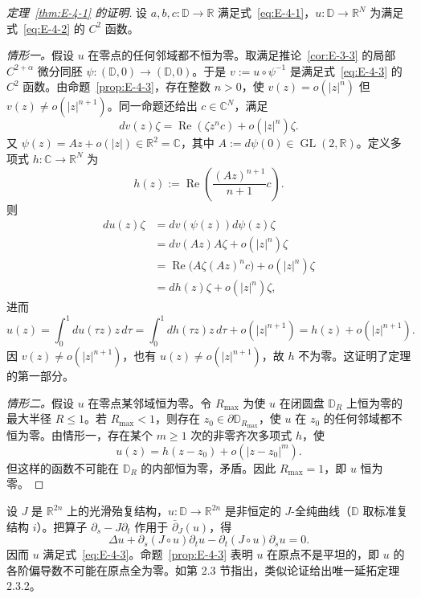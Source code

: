 \begin{proof}[定理~\ref{thm:E-4-1} 的证明]
设 $a,b,c:\mathbb D\to\mathbb R$ 满足式~\eqref{eq:E-4-1}，$u:\mathbb D\to\mathbb R^N$ 为满足式~\eqref{eq:E-4-2} 的 $C^2$ 函数。

\emph{情形一。}假设 $u$ 在零点的任何邻域都不恒为零。取满足推论~\ref{cor:E-3-3} 的局部 $C^{2+\alpha}$ 微分同胚 $\psi:(\mathbb D,0)\to(\mathbb D,0)$。于是 $v:=u\circ\psi^{-1}$ 是满足式~\eqref{eq:E-4-3} 的 $C^2$ 函数。由命题~\ref{prop:E-4-3}，存在整数 $n>0$，使 $v(z)=o(|z|^n)$ 但 $v(z)\ne o(|z|^{n+1})$。同一命题还给出 $c\in\mathbb C^N$，满足
\[
  dv(z)\zeta=\operatorname{Re}(\zeta z^nc)+o(|z|^n)\zeta.
\]
又 $\psi(z)=Az+o(|z|)\in\mathbb R^2=\mathbb C$，其中 $A:=d\psi(0)\in\operatorname{GL}(2,\mathbb R)$。定义多项式 $h:\mathbb C\to\mathbb R^N$ 为
\[
  h(z):=\operatorname{Re}\left(\frac{(Az)^{n+1}}{n+1}c\right).
\]
则
\begin{align*}
du(z)\zeta
 &=dv(\psi(z))d\psi(z)\zeta\\
 &=dv(Az)A\zeta+o(|z|^n)\zeta\\
 &=\operatorname{Re}\bigl(A\zeta(Az)^nc\bigr)+o(|z|^n)\zeta\\
 &=dh(z)\zeta+o(|z|^n)\zeta,
\end{align*}
进而
\[
  u(z)=\int_0^1du(\tau z)z\,d\tau
      =\int_0^1dh(\tau z)z\,d\tau+o(|z|^{n+1})
      =h(z)+o(|z|^{n+1}).
\]
因 $v(z)\ne o(|z|^{n+1})$，也有 $u(z)\ne o(|z|^{n+1})$，故 $h$ 不为零。这证明了定理的第一部分。

\emph{情形二。}假设 $u$ 在零点某邻域恒为零。令 $R_{\max}$ 为使 $u$ 在闭圆盘 $\mathbb D_R$ 上恒为零的最大半径 $R\le1$。若 $R_{\max}<1$，则存在 $z_0\in\partial\mathbb D_{R_{\max}}$，使 $u$ 在 $z_0$ 的任何邻域都不恒为零。由情形一，存在某个 $m\ge1$ 次的非零齐次多项式 $h$，使
\[
  u(z)=h(z-z_0)+o(|z-z_0|^m).
\]
但这样的函数不可能在 $\mathbb D_R$ 的内部恒为零，矛盾。因此 $R_{\max}=1$，即 $u$ 恒为零。
\end{proof}

\begin{remark}\label{rem:E-4-4}
设 $J$ 是 $\mathbb R^{2n}$ 上的光滑殆复结构，$u:\mathbb D\to\mathbb R^{2n}$ 是非恒定的 $J$-全纯曲线（$\mathbb D$ 取标准复结构 $i$）。把算子 $\partial_s-J\partial_t$ 作用于 $\bar\partial_J(u)$，得
\[
  \Delta u+\partial_s(J\circ u)\partial_tu
  -\partial_t(J\circ u)\partial_su=0.
\]
因而 $u$ 满足式~\eqref{eq:E-4-3}。命题~\ref{prop:E-4-3} 表明 $u$ 在原点不是平坦的，即 $u$ 的各阶偏导数不可能在原点全为零。如第 2.3 节指出，类似论证给出唯一延拓定理 2.3.2。
\end{remark}
